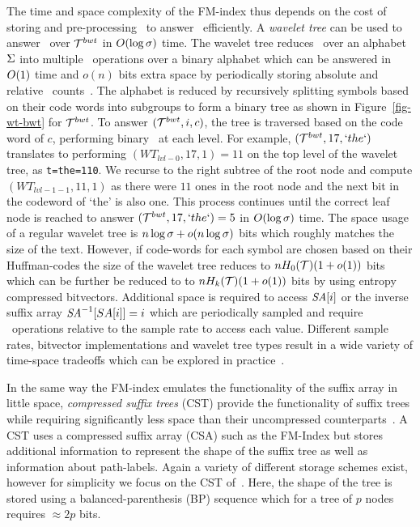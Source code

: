 The time and space complexity of the FM-index thus depends on the cost of storing
and pre-processing \colbwt\ to answer \rankop\ efficiently. A {\it wavelet tree}
can be used to answer \rankop\ over $\mathcal{T}^{bwt}$ in $O(\log \sigma)$ time.
The wavelet tree reduces \rankop\ over an alphabet $\Sigma$ into multiple
\rankop\ operations over a binary alphabet which can be answered 
in $O(1)$ time and $o(n)$ bits extra space by periodically storing absolute
and relative \rankop\ counts~\cite{m-fsttcs96}. The alphabet is
reduced by recursively splitting symbols based on their code words into subgroups to 
form a binary tree as shown in Figure~\ref{fig-wt-bwt} for $\mathcal{T}^{bwt}$. To answer
\rankop$(\mathcal{T}^{bwt},i,c)$, the tree is traversed based on the code word of $c$, performing
binary \rankop\ at each level. For example, \rankop$(\mathcal{T}^{bwt},17,`the`)$ translates
to performing \rankop$(WT_{lvl-0},17,1)=11$ on the top level of the wavelet 
tree, as {\tt t=the=110}. We recurse to the right subtree of the root node and
compute \rankop$(WT_{lvl-1-1},11,1)$ as there were $11$ ones in the root node and
the next bit in the codeword of `the' is also one. This process continues until 
the correct leaf node is reached to answer \rankop$(\mathcal{T}^{bwt},17,`the`)=5$ in 
$O(\log \sigma)$ time. The space usage of a regular wavelet tree is
$n \log \sigma + o(n \log \sigma)$ bits which roughly
matches the size of the text. However, if code-words for each symbol are chosen
based on their Huffman-codes the size of the wavelet tree reduces to $nH_0(\mathcal{T})(1 + o(1))$
bits which can be further be reduced to to $nH_k(\mathcal{T})(1 + o(1))$ bits by using 
entropy compressed bitvectors. Additional space is required to access $\mbox{\emph{SA}}[i]$
or the inverse suffix array $\mbox{\emph{SA}}^{-1}[SA[i]]=i$ which are periodically sampled
and require \rankop\ operations relative to the sample rate to access each value.
Different sample rates, bitvector implementations and wavelet tree types result
in a wide variety of time-space tradeoffs which can be explored 
in practice~\cite{gbmp2014sea}.

In the same way the FM-index emulates the functionality of the suffix array in
little space, {\it compressed suffix trees} (CST) provide the functionality
of suffix trees while requiring significantly less space than their uncompressed
counterparts~\cite{ofg-spire10}. A CST uses a compressed suffix array (CSA) such
as the FM-Index but stores additional information to represent the shape of
the suffix tree as well as information about path-labels. Again a variety
of different storage schemes exist, however for simplicity we focus on
the CST of~. Here, the shape of the tree
is stored using a balanced-parenthesis (BP) sequence which for a tree of $p$ nodes
requires $\approx 2p$ bits.

